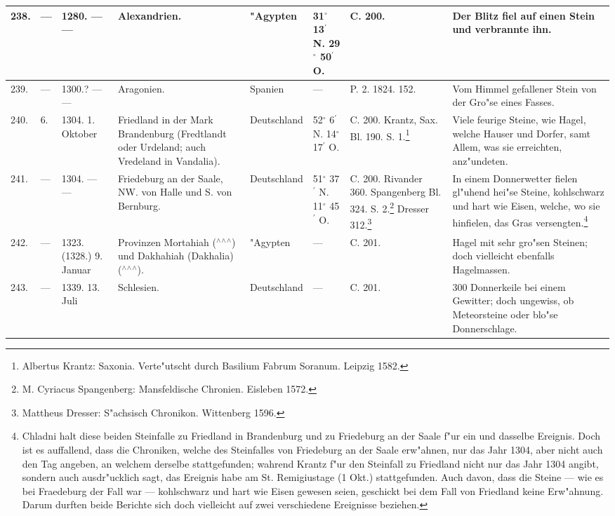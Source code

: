\documentclass[a4paper, 8pt, oneside, polutonikogreek, german]{article}
\begin{document}
\begin{center}
\begin{longtable}{| p{5mm} | p{3mm} | p{15mm} | p{25mm} | p{20mm} | p{14mm} | p{17mm} | p{24mm} |}
        238. & --- & 1280. --- --- & Alexandrien. & "Agypten & 31$^\circ$ 13$^\prime$ N. 29$^\circ$ 50$^\prime$ O. & C. 200. & Der Blitz fiel auf einen Stein und verbrannte ihn. \\ \hline
        239. & --- & 1300.? --- --- & Aragonien. & Spanien & --- & P. 2. 1824. 152. & Vom Himmel gefallener Stein von der Gro"se eines Fasses. \\ \hline
        240. & 6. & 1304. 1. Oktober & Friedland in der Mark Brandenburg (Fredtlandt oder Urdeland; auch Vredeland in Vandalia). & Deutschland & 52$^\circ$ 6$^\prime$ N. 14$^\circ$ 17$^\prime$ O. & C. 200. Krantz, Sax. Bl. 190. S. 1.\footnote{Albertus Krantz: Saxonia. Verte"utscht durch Basilium Fabrum Soranum. Leipzig 1582.
} & Viele feurige Steine, wie Hagel, welche Hauser und Dorfer, samt Allem, was sie erreichten, anz"undeten. \\ \hline
        241. & --- & 1304. --- --- & Friedeburg an der Saale, NW. von Halle und S. von Bernburg. & Deutschland & 51$^\circ$ 37$^\prime$ N. 11$^\circ$ 45$^\prime$ O. & C. 200. Rivander 360. Spangenberg Bl. 324. S. 2.\footnote{M. Cyriacus Spangenberg: Mansfeldische Chronien. Eisleben 1572.} Dresser 312.\footnote{Mattheus Dresser: S"achsisch Chronikon. Wittenberg 1596.} & In einem Donnerwetter fielen gl"uhend hei"se Steine, kohlschwarz und hart wie Eisen, welche, wo sie hinfielen, das Gras versengten.\footnote{Chladni halt diese beiden Steinfalle zu Friedland in Brandenburg und zu Friedeburg an der Saale f"ur ein und dasselbe Ereignis. Doch ist es auffallend, dass die Chroniken, welche des Steinfalles von Friedeburg an der Saale erw"ahnen, nur das Jahr 1304, aber nicht auch den Tag angeben, an welchem derselbe stattgefunden; wahrend Krantz f"ur den Steinfall zu Friedland nicht nur das Jahr 1304 angibt, sondern auch ausdr"ucklich sagt, das Ereignis habe am St. Remigiustage (1 Okt.) stattgefunden. Auch davon, dass die Steine --- wie es bei Fraedeburg der Fall war --- kohlschwarz und hart wie Eisen gewesen seien, geschickt bei dem Fall von Friedland keine Erw"ahnung. Darum durften beide Berichte sich doch vielleicht auf zwei verschiedene Ereignisse beziehen.} \\ \hline
        242. & --- & 1323. (1328.) 9. Januar & Provinzen Mortahiah ($^\wedge$$^\wedge$$^\wedge$) und Dakhahiah (Dakhalia) ($^\wedge$$^\wedge$$^\wedge$). & "Agypten & --- & C. 201. & Hagel mit sehr gro"sen Steinen; doch vielleicht ebenfalls Hagelmassen. \\ \hline
        243. & --- & 1339. 13. Juli & Schlesien. & Deutschland & --- & C. 201. & 300 Donnerkeile bei einem Gewitter; doch ungewiss, ob Meteorsteine oder blo"se Donnerschlage. \\ \hline

\end{longtable}
\end{center}
\end{document}
